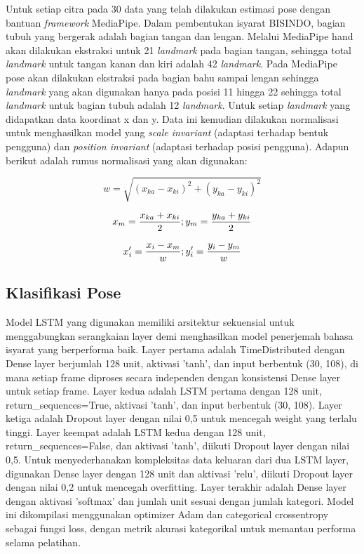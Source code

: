 Untuk setiap citra pada 30 data yang telah dilakukan estimasi pose dengan bantuan \textit{framework} MediaPipe. Dalam pembentukan isyarat BISINDO, bagian tubuh yang bergerak adalah bagian tangan dan lengan. Melalui MediaPipe hand akan dilakukan ekstraksi untuk 21 \textit{landmark} pada bagian tangan, sehingga total \textit{landmark} untuk tangan kanan dan kiri adalah 42 \textit{landmark}. Pada MediaPipe pose akan dilakukan ekstraksi pada bagian bahu sampai lengan sehingga \textit{landmark} yang akan digunakan hanya pada posisi 11 hingga 22 sehingga total \textit{landmark} untuk bagian tubuh adalah 12 \textit{landmark}. Untuk setiap \textit{landmark} yang didapatkan data koordinat x dan y. Data ini kemudian dilakukan normalisasi untuk menghasilkan model yang \textit{scale invariant} (adaptasi terhadap bentuk pengguna) dan \textit{position invariant} (adaptasi terhadap posisi pengguna). Adapun berikut adalah rumus normalisasi yang akan digunakan:

\begin{equation}
  \label{eq:shouderWidthNorm}
  w = \sqrt{(x_{ka} - x_{ki})^2 + (y_{ka} - y_{ki})^2}
\end{equation}

\begin{equation}
  \label{eq:shoulderMidpointNorm}
  x_m = \frac{x_{ka} + x_{ki}}{2} ; \\
   y_m = \frac{y_{ka} + y_{ki}}{2}
\end{equation}

\begin{equation}
  \label{eq:normalization}
  x'_i = \frac{x_i - x_m}{w} ;  \\
   y'_i = \frac{y_i - y_m}{w}
\end{equation}

\subsection{Klasifikasi Pose}
\label{subsec:klasifikasipose}

Model LSTM yang digunakan memiliki arsitektur sekuensial untuk menggabungkan serangkaian layer demi menghasilkan model penerjemah bahasa isyarat yang berperforma baik. Layer pertama adalah TimeDistributed dengan Dense layer berjumlah 128 unit, aktivasi 'tanh', dan input berbentuk (30, 108), di mana setiap frame diproses secara independen dengan konsistensi Dense layer untuk setiap frame. Layer kedua adalah LSTM pertama dengan 128 unit, return\_sequences=True, aktivasi 'tanh', dan input berbentuk (30, 108). Layer ketiga adalah Dropout layer dengan nilai 0,5 untuk mencegah weight yang terlalu tinggi. Layer keempat adalah LSTM kedua dengan 128 unit, return\_sequences=False, dan aktivasi 'tanh', diikuti Dropout layer dengan nilai 0,5. Untuk menyederhanakan kompleksitas data keluaran dari dua LSTM layer, digunakan Dense layer dengan 128 unit dan aktivasi 'relu', diikuti Dropout layer dengan nilai 0,2 untuk mencegah overfitting. Layer terakhir adalah Dense layer dengan aktivasi 'softmax' dan jumlah unit sesuai dengan jumlah kategori. Model ini dikompilasi menggunakan optimizer Adam dan categorical crossentropy sebagai fungsi loss, dengan metrik akurasi kategorikal untuk memantau performa selama pelatihan.

